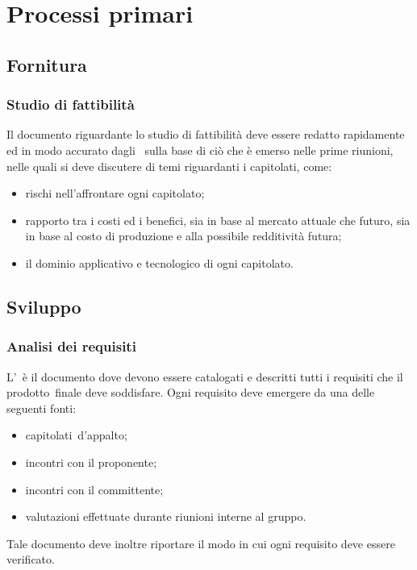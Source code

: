 \documentclass[../NormeProgetto.text]{subfiles}
\begin{document}
\section{Processi primari}
	\subsection{Fornitura}
		\subsubsection{Studio di fattibilità}
			Il documento riguardante lo studio di fattibilità deve essere redatto rapidamente ed in modo accurato dagli \analisti\ sulla base di ciò che è emerso nelle prime riunioni, nelle quali si deve discutere di temi riguardanti i capitolati, come:
			\begin{itemize}
				\item rischi nell'affrontare ogni capitolato\g;
				\item rapporto tra i costi ed i benefici, sia in base al mercato attuale che futuro, sia in base al costo di produzione e alla possibile redditività futura;
				\item il dominio applicativo e tecnologico di ogni capitolato\g.
			\end{itemize}
	\subsection{Sviluppo}
		\subsubsection{Analisi dei requisiti}
			L'\analisideirequisiti\ è il documento dove devono essere catalogati e descritti tutti i requisiti che il prodotto\g\ finale deve soddisfare. Ogni requisito deve emergere da una delle seguenti fonti:
			\begin{itemize}
				\item capitolati\g\ d'appalto;
				\item incontri con il proponente;
				\item incontri con il committente;
				\item valutazioni effettuate durante riunioni interne al gruppo.
			\end{itemize}
			Tale documento deve inoltre riportare il modo in cui ogni requisito deve essere verificato.
\end{document}
